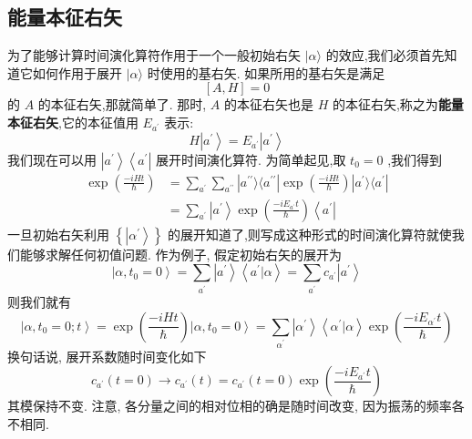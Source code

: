 \documentclass[lang=cn,newtx,10pt,scheme=chinese,thmcnt=section]{elegantbook}
\begin{document}
\subsection*{能量本征右矢}
为了能够计算时间演化算符作用于一个一般初始右矢 $|\alpha \rangle$ 的效应,我们必须首先知道它如何作用于展开 $|\alpha \rangle$ 时使用的基右矢. 如果所用的基右矢是满足
\begin{equation}
	\left\lbrack {A, H}\right\rbrack = 0
\end{equation}
的 $A$ 的本征右矢,那就简单了. 那时, $A$ 的本征右矢也是 $H$ 的本征右矢,称之为\textbf{能量本征右矢},它的本征值用 ${E}_{{a}^{\prime }}$ 表示:
\begin{equation}
	H\left| {a}^{\prime }\right\rangle = {E}_{{a}^{\prime }}\left| {a}^{\prime }\right\rangle
\end{equation}
我们现在可以用 $\left| {a}^{\prime }\right\rangle \left\langle {a}^{\prime }\right|$ 展开时间演化算符. 为简单起见,取 ${t}_{0} = 0$ ,我们得到
\begin{equation}
	\begin{aligned}
		\exp ( \frac{-{iHt}}{\hbar }) &= \mathop{\sum }\limits_{{a}^{\prime }}\mathop{\sum }\limits_{{a}^{\prime \prime }}| {a}^{\prime \prime }\rangle \langle {{a}^{\prime \prime }| {\exp ( \frac{-{iHt}}{\hbar }) }| {a}^{\prime }}\rangle \langle {a}^{\prime }|\\
		&=\mathop{\sum }\limits_{{a}^{\prime }}\left| {a}^{\prime }\right\rangle \exp \left( \frac{-i{E}_{{a}^{\prime }}t}{\hbar }\right) \left\langle {a}^{\prime }\right|
	\end{aligned}
\end{equation}
一旦初始右矢利用 $\left\{ \left| {\alpha }^{\prime }\right\rangle \right\}$ 的展开知道了,则写成这种形式的时间演化算符就使我们能够求解任何初值问题. 作为例子, 假定初始右矢的展开为
\begin{equation}
	\left| {\alpha ,{t}_{0} = 0}\right\rangle = \mathop{\sum }\limits_{{a}^{\prime }}\left| {a}^{\prime }\right\rangle \left\langle {{a}^{\prime } | \alpha }\right\rangle = \mathop{\sum }\limits_{{a}^{\prime }}{c}_{{a}^{\prime }}\left| {a}^{\prime }\right\rangle
\end{equation}
则我们就有
\begin{equation}
	\left| {\alpha ,{t}_{0} = 0;t}\right\rangle = \exp \left( \frac{-{iHt}}{\hbar }\right) \left| {\alpha ,{t}_{0} = 0}\right\rangle = \mathop{\sum }\limits_{{\alpha }^{\prime }}\left| {\alpha }^{\prime }\right\rangle \left\langle {{\alpha }^{\prime } | \alpha }\right\rangle \exp \left( \frac{-i{E}_{{\alpha }^{\prime }}t}{\hbar }\right)
\end{equation}
换句话说, 展开系数随时间变化如下
\begin{equation}
	{c}_{{a}^{\prime }}\left( {t = 0}\right) \rightarrow {c}_{{a}^{\prime }}\left( t\right) = {c}_{{a}^{\prime }}\left( {t = 0}\right) \exp \left( \frac{-i{E}_{{a}^{\prime }}t}{\hbar }\right)
\end{equation}
其模保持不变. 注意, 各分量之间的相对位相的确是随时间改变, 因为振荡的频率各不相同.
\end{document}
